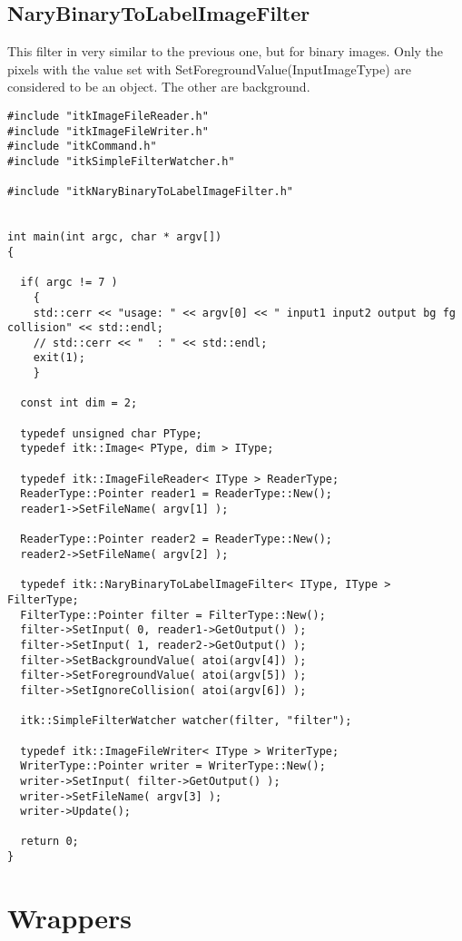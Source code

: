 \documentclass{InsightArticle}
\begin{document}
\subsection{NaryBinaryToLabelImageFilter}

This filter in very similar to the previous one, but for binary images. Only the pixels with
the value set with SetForegroundValue(InputImageType) are considered to be an object. The other
are background.

\small \begin{verbatim}
#include "itkImageFileReader.h"
#include "itkImageFileWriter.h"
#include "itkCommand.h"
#include "itkSimpleFilterWatcher.h"

#include "itkNaryBinaryToLabelImageFilter.h"


int main(int argc, char * argv[])
{

  if( argc != 7 )
    {
    std::cerr << "usage: " << argv[0] << " input1 input2 output bg fg collision" << std::endl;
    // std::cerr << "  : " << std::endl;
    exit(1);
    }

  const int dim = 2;
  
  typedef unsigned char PType;
  typedef itk::Image< PType, dim > IType;

  typedef itk::ImageFileReader< IType > ReaderType;
  ReaderType::Pointer reader1 = ReaderType::New();
  reader1->SetFileName( argv[1] );

  ReaderType::Pointer reader2 = ReaderType::New();
  reader2->SetFileName( argv[2] );

  typedef itk::NaryBinaryToLabelImageFilter< IType, IType > FilterType;
  FilterType::Pointer filter = FilterType::New();
  filter->SetInput( 0, reader1->GetOutput() );
  filter->SetInput( 1, reader2->GetOutput() );
  filter->SetBackgroundValue( atoi(argv[4]) );
  filter->SetForegroundValue( atoi(argv[5]) );
  filter->SetIgnoreCollision( atoi(argv[6]) );

  itk::SimpleFilterWatcher watcher(filter, "filter");

  typedef itk::ImageFileWriter< IType > WriterType;
  WriterType::Pointer writer = WriterType::New();
  writer->SetInput( filter->GetOutput() );
  writer->SetFileName( argv[3] );
  writer->Update();

  return 0;
}
\end{verbatim} \normalsize

\section{Wrappers}
\end{document}
